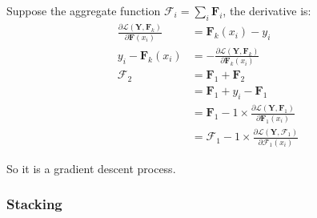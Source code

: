 Suppose the aggregate function $\mathcal{F}_i = \sum\limits_i \mathbf{F}_i $, the derivative is:
\begin{equation}
	\begin{aligned}
		\frac{\partial \mathcal{L}(\mathbf{Y},\mathbf{F}_k)}{\partial \mathbf{F}(x_i)} &= \mathbf{F}_k (x_i) - y_i \\
		y_i - \mathbf{F}_k (x_i) &= - \frac{\partial \mathcal{L}(\mathbf{Y},\mathbf{F}_k )}{\partial \mathbf{F}_k (x_i)}\\
		\mathcal{F}_2 &= \mathbf{F}_1 + \mathbf{F}_2 \\
		&= \mathbf{F}_1 + y_i - \mathbf{F}_1 \\
		&= \mathbf{F}_1 - 1 \times \frac{\partial \mathcal{L}(\mathbf{Y},\mathbf{F}_1 )}{\partial \mathbf{F}_1 (x_i)} \\
		&= \mathcal{F}_1 - 1 \times \frac{\partial \mathcal{L}(\mathbf{Y},\mathcal{F}_1 )}{\partial \mathcal{F}_1 (x_i)} 
	\end{aligned}
\end{equation}

So it is a gradient descent process.


\subsubsection{Stacking}

